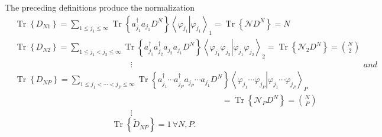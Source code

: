 \documentclass[aps,preprint]{revtex4}%
\begin{document}
The preceding definitions produce the normalization
\begin{subequations}
\label{RedDenMat}%
\begin{align}
&  \operatorname{Tr}\left\{  D_{N1}\right\}  =\sum_{1\leq j_{1}\leq\infty
}\operatorname{Tr}\left\{  a_{j_{1}}^{\dagger}a_{j_{1}}D^{N}\right\}  \text{
}\left\langle \left.  \varphi_{j_{1}}\right\vert \varphi_{j_{1}}\right\rangle
_{1}=\operatorname{Tr}\left\{  \mathcal{N}D^{N}\right\}  =N\nonumber\\
&  \operatorname{Tr}\left\{  D_{N2}\right\}  =\sum_{1\leq j_{1}<j_{2}%
\leq\infty}\operatorname{Tr}\left\{  a_{j_{1}}^{\dagger}a_{j_{2}}^{\dagger
}a_{j_{2}}a_{j_{1}}D^{N}\right\}  \left\langle \left.  \varphi_{j_{1}}%
\varphi_{j_{2}}\right\vert \varphi_{j_{1}}\varphi_{j_{2}}\right\rangle
_{2}=\operatorname{Tr}\left\{  \mathcal{N}_{2}D^{N}\right\}  =\binom{N}%
{2}\nonumber\\
&  \qquad\qquad\qquad\quad\qquad\qquad\qquad\quad\vdots\nonumber\\
&  \operatorname{Tr}\left\{  D_{NP}\right\}  =\sum_{1\leq j_{1}<\cdots
<j_{P}\leq\infty}\operatorname{Tr}\left\{  a_{j_{1}}^{\dagger}\cdots a_{j_{P}%
}^{\dagger}a_{j_{P}}\cdots a_{j_{1}}D^{N}\right\}  \left\langle \left.
\varphi_{j_{1}}\cdots\varphi_{j_{P}}\right\vert \varphi_{j_{1}}\cdots
\varphi_{j_{P}}\right\rangle _{P}\nonumber\\
&  \qquad\qquad\qquad\qquad\qquad\qquad\qquad\qquad\qquad\qquad\qquad
\qquad\quad\left.  =\right.  \operatorname{Tr}\left\{  \mathcal{N}_{P}%
D^{N}\right\}  =\binom{N}{P}\nonumber\\
&  \qquad\qquad\qquad\quad\qquad\qquad\qquad\quad\vdots\label{RdDenMat}%
\end{align}
and
\end{subequations}
\begin{equation}
\operatorname{Tr}\left\{  \tilde{D}_{NP}\right\}  =1\,\forall N,P.
\end{equation}
\end{document}
